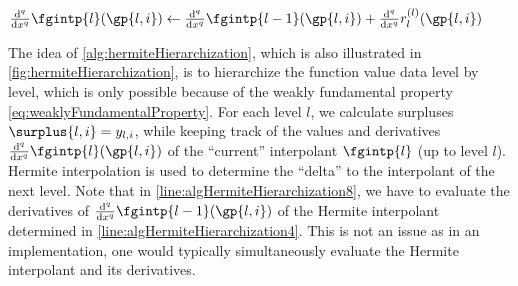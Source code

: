 \begin{algorithm}
\begin{algorithmic}[1]
{              %
              $\frac{\diff^q}{\dx^q} \fgintp{l}(\gp{l,i})
              \gets \frac{\diff^q}{\dx^q} \fgintp{l-1}(\gp{l,i}) +
              \frac{\diff^q}{\dx^q} r^{(l)}_l(\gp{l,i})$%
            }
            \label{line:algHermiteHierarchization8}
          \EndFor{}
        \EndFor{}
      \EndFor{}
    \EndFunction{}
  \end{algorithmic}
  \caption[%
    Hermite hierarchization%
  ]{%
    Hermite hierarchization on one-dimensional regular grids.
    Inputs are
    the vector $\vlinin = (\linin{l,i})_{(l,i) \in \liset}$
    of input data (function values $\fcnval{l,i}$ at the grid points) and
    the level $n$ of the regular grid,
    where $\liset = \{(l, i) \mid l = 0, \dotsc, n,\; i \in \hiset{l}\}$.
    The output is the vector
    $\vlinout = (\linout{l,i})_{(l,i) \in \liset}$
    of output data (hierarchical surpluses $\surplus{l,i}$).%
  }%
  \label{alg:hermiteHierarchization}%
\end{algorithm}

The idea of \cref{alg:hermiteHierarchization},
which is also illustrated in \cref{fig:hermiteHierarchization},
is to hierarchize the function value data level by level,
which is only possible because of the weakly fundamental property
\eqref{eq:weaklyFundamentalProperty}.
For each level $l$, we calculate surpluses
$\surplus{l,i} = \linout{l,i}$, while keeping track of
the values and derivatives
$\frac{\diff^q}{\dx^q} \fgintp{l}(\gp{l,i})$ of the
``current'' interpolant $\fgintp{l}$ (up to level $l$).
Hermite interpolation is used to determine the ``delta''
to the interpolant of the next level.
Note that in \cref{line:algHermiteHierarchization8},
we have to evaluate the derivatives of
$\frac{\diff^q}{\dx^q} \fgintp{l-1}(\gp{l,i})$ of the Hermite interpolant
determined in \cref{line:algHermiteHierarchization4}.
This is not an issue as in an implementation,
one would typically simultaneously evaluate the
Hermite interpolant and its derivatives.

